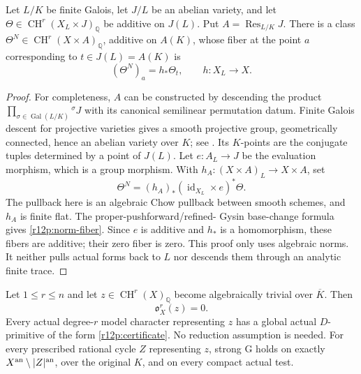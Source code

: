 \begin{lemma}
\label{r12p:norm-family}
Let $L/K$ be finite Galois, let $J/L$ be an abelian variety, and let
$\Theta\in\operatorname{CH}^r(X_L\times J)_{\mathbb Q}$ be
additive on $J(L)$.  Put $A=\operatorname{Res}_{L/K}J$.
There is a class
$\Theta^N\in\operatorname{CH}^r(X\times A)_{\mathbb Q}$,
additive on $A(K)$, whose fiber at the point $a$ corresponding to
$t\in J(L)=A(K)$ is
\[
                    (\Theta^N)_a=h_*\Theta_t,
                    \qquad h:X_L\longrightarrow X.
\tag{R12.P10}\label{r12p:norm-fiber}
\]
\end{lemma}

\begin{proof}
For completeness, $A$ can be constructed by descending the product
$\prod_{\sigma\in\operatorname{Gal}(L/K)}{}^\sigma J$ with its
canonical semilinear permutation datum.  Finite Galois descent for
projective varieties gives a smooth projective group, geometrically
connected, hence an abelian variety over $K$; see
\cite[Proposition 1.8]{MilneJV}.  Its $K$-points are the conjugate
tuples determined by a point of $J(L)$.  Let $e:A_L\to J$ be the
evaluation morphism, which is a group morphism.  With
$h_A:(X\times A)_L\to X\times A$, set
\[
 \Theta^N=(h_A)_*(\operatorname{id}_{X_L}\times e)^*\Theta.
\tag{R12.P11}\label{r12p:norm-family-formula}
\]
The pullback here is an algebraic Chow pullback between smooth
schemes, and $h_A$ is finite flat.  The proper-pushforward/refined-
Gysin base-change formula gives \eqref{r12p:norm-fiber}.
Since $e$ is additive and $h_*$ is a homomorphism, these fibers are
additive; their zero fiber is zero.  This proof only uses algebraic
norms.  It neither pulls actual forms back to $L$ nor descends them
through an analytic finite trace.
\end{proof}

\begin{theorem}
\label{r12p:geometric-algebraic}
Let $1\leq r\leq n$ and let
$z\in\operatorname{CH}^r(X)_{\mathbb Q}$ become algebraically
trivial over $\overline K$.  Then
\[
                              \mathfrak o_X^r(z)=0.
\tag{R12.P12}\label{r12p:alg-zero}
\]
Every actual degree-$r$ model character representing $z$ has a
global actual $D$-primitive of the form
\eqref{r12p:certificate}.  No reduction assumption is needed.
For every prescribed rational cycle $Z$ representing $z$, strong G
holds on exactly $X^{\rm an}\setminus|Z|^{\rm an}$, over the
original $K$, and on every compact actual test.
\end{theorem}

